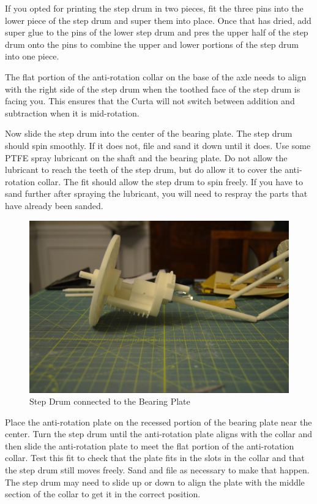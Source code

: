 \documentclass[openany]{book}
\begin{document}
If you opted for printing the step drum in two pieces, fit the three pins into the lower piece of 
the step drum and super them into place. Once that has dried, add super glue to the pins of the lower
step drum and pres the upper half of the step drum onto the pins to combine the upper and lower
portions of the step drum into one piece.




The flat portion of the anti-rotation collar on the base of the axle needs to align with the right
side of the step drum when the toothed face of the step drum is facing you. This ensures that
the Curta will not switch between addition and subtraction when it is mid-rotation.



Now slide the step drum into the center of the bearing plate. The step drum should spin smoothly.
If it does not, file and sand it down until it does. Use some PTFE spray lubricant on the shaft and
the bearing plate. Do not allow the lubricant to reach the teeth of the step drum, but do allow it
to cover the anti-rotation collar. The fit should allow the step drum to spin freely. If you have to
sand further after spraying the lubricant, you will need to respray the parts that have already been
sanded.

\begin{figure}[!ht]
	\centering
	\includegraphics[width=.75\textwidth]{images/image9.jpg}
	\caption{Step Drum connected to the Bearing Plate}
	\label{fig:image9}	
\end{figure}


Place the anti-rotation plate on the recessed portion of the bearing plate near the center. Turn the
step drum until the anti-rotation plate aligns with the collar and then slide the anti-rotation
plate to meet the flat portion of the anti-rotation collar. Test this fit to check that the plate
fits in the slots in the collar and that the step drum still moves freely. Sand and file as necessary
to make that happen. The step drum may need to slide up or down to align the plate with the middle 
section of the collar to get it in the correct position.
\end{document}
